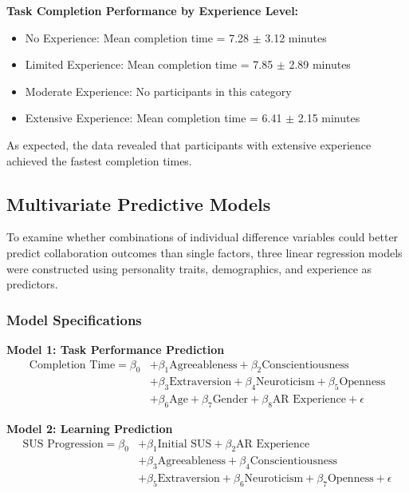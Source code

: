 \textbf{Task Completion Performance by Experience Level:}
\begin{itemize}
\item No Experience: Mean completion time = 7.28 $\pm$ 3.12 minutes
\item Limited Experience: Mean completion time = 7.85 $\pm$ 2.89 minutes  
\item Moderate Experience: No participants in this category
\item Extensive Experience: Mean completion time = 6.41 $\pm$ 2.15 minutes
\end{itemize}

As expected, the data revealed that participants with extensive experience achieved the fastest completion times.

\subsection{Multivariate Predictive Models}
To examine whether combinations of individual difference variables could better predict collaboration outcomes than single factors, three linear regression models were constructed using personality traits, demographics, and experience as predictors.

\subsubsection{Model Specifications}

\textbf{Model 1: Task Performance Prediction}
\begin{align}
\text{Completion Time} = \beta_0 &+ \beta_1 \text{Agreeableness} + \beta_2 \text{Conscientiousness} \nonumber \\
&+ \beta_3 \text{Extraversion} + \beta_4 \text{Neuroticism} + \beta_5 \text{Openness} \nonumber \\
&+ \beta_6 \text{Age} + \beta_7 \text{Gender} + \beta_8 \text{AR Experience} + \epsilon
\end{align}

\textbf{Model 2: Learning Prediction}
\begin{align}
\text{SUS Progression} = \beta_0 &+ \beta_1 \text{Initial SUS} + \beta_2 \text{AR Experience} \nonumber \\
&+ \beta_3 \text{Agreeableness} + \beta_4 \text{Conscientiousness} \nonumber \\
&+ \beta_5 \text{Extraversion} + \beta_6 \text{Neuroticism} + \beta_7 \text{Openness} + \epsilon
\end{align}

